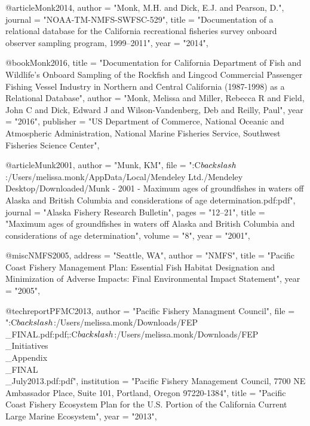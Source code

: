 {@article{Monk2014,
    author = "{Monk, M.H. and Dick, E.J. and Pearson, D.}",
    journal = "{NOAA-TM-NMFS-SWFSC-529}",
    title = "{{Documentation of a relational database for the California recreational fisheries survey onboard observer sampling program, 1999--2011}}",
    year = "{2014}",
}

@book{Monk2016,
    title = "{Documentation for California Department of Fish and Wildlife's Onboard Sampling of the Rockfish and Lingcod Commercial Passenger Fishing Vessel Industry in Northern and Central California (1987-1998) as a Relational Database}",
    author = "{Monk, Melissa and Miller, Rebecca R and Field, John C and Dick, Edward J and Wilson-Vandenberg, Deb and Reilly, Paul}",
    year = "{2016}",
    publisher = "{US Department of Commerce, National Oceanic and Atmospheric Administration, National Marine Fisheries Service, Southwest Fisheries Science Center}",
}

@article{Munk2001,
    author = "{Munk, KM}",
    file = "{:C$\\backslash$:/Users/melissa.monk/AppData/Local/Mendeley Ltd./Mendeley Desktop/Downloaded/Munk - 2001 - Maximum ages of groundfishes in waters off Alaska and British Columbia and considerations of age determination.pdf:pdf}",
    journal = "{Alaska Fishery Research Bulletin}",
    pages = "{12--21}",
    title = "{{Maximum ages of groundfishes in waters off Alaska and British Columbia and considerations of age determination}}",
    volume = "{8}",
    year = "{2001}",
}

@misc{NMFS2005,
    address = "{Seattle, WA}",
    author = "{NMFS}",
    title = "{{Pacific Coast Fishery Management Plan: Essential Fish Habitat Designation and Minimization of Adverse Impacts: Final Environmental Impact Statement}}",
    year = "{2005}",
}

@techreport{PFMC2013,
    author = "{{Pacific Fishery Managment Council}}",
    file = "{:C$\\backslash$:/Users/melissa.monk/Downloads/FEP\\_FINAL.pdf:pdf;:C$\\backslash$:/Users/melissa.monk/Downloads/FEP\\_Initiatives\\_Appendix\\_FINAL\\_July2013.pdf:pdf}",
    institution = "{Pacific Fishery Management Council, 7700 NE Ambassador Place, Suite 101, Portland, Oregon 97220-1384}",
    title = "{{Pacific Coast Fishery Ecosystem Plan for the U.S. Portion of the California Current Large Marine Ecosystem}}",
    year = "{2013}",
}

}
